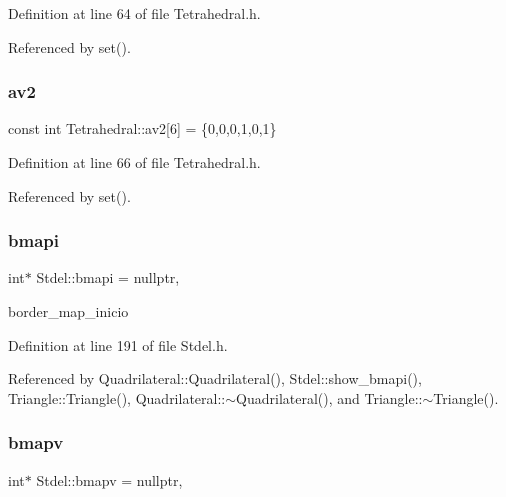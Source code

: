 Definition at line 64 of file Tetrahedral.\+h.



Referenced by set().

\mbox{\label{classTetrahedral_ae82fd07d8240a433ef8d7772975a99a1}} 
\subsubsection{\texorpdfstring{av2}{av2}}
{\footnotesize\ttfamily const int Tetrahedral\+::av2\mbox{[}6\mbox{]} = \{0,0,0,1,0,1\}\hspace{0.3cm}{\ttfamily [private]}}



Definition at line 66 of file Tetrahedral.\+h.



Referenced by set().

\mbox{\label{classStdel_a8b082d27e5c3cab7ad2045b464af0fd9}} 
\subsubsection{\texorpdfstring{bmapi}{bmapi}}
{\footnotesize\ttfamily int$\ast$ Stdel\+::bmapi = nullptr\hspace{0.3cm}{\ttfamily [protected]}, {\ttfamily [inherited]}}



border\+\_\+map\+\_\+inicio 



Definition at line 191 of file Stdel.\+h.



Referenced by Quadrilateral\+::\+Quadrilateral(), Stdel\+::show\+\_\+bmapi(), Triangle\+::\+Triangle(), Quadrilateral\+::$\sim$\+Quadrilateral(), and Triangle\+::$\sim$\+Triangle().

\mbox{\label{classStdel_ac3cd818c98aa400279f28c22c8e0abaa}} 
\subsubsection{\texorpdfstring{bmapv}{bmapv}}
{\footnotesize\ttfamily int$\ast$ Stdel\+::bmapv = nullptr\hspace{0.3cm}{\ttfamily [protected]}, {\ttfamily [inherited]}}



